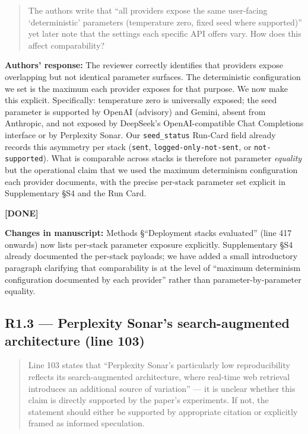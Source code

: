 \documentclass[11pt,a4paper]{article}
\newenvironment{revquote}{%
  \begin{quote}\small\itshape\color{revgray}
}{%
  \end{quote}
}
\newcommand{\response}[1]{\par\noindent\textbf{\color{revgreen}Authors' response:} #1\par}
\newcommand{\changes}[1]{\par\noindent\textbf{\color{revblue}Changes in manuscript:} #1\par}
\newcommand{\done}{\color{revgreen}\textbf{[DONE]}}
\begin{document}
\begin{revquote}
The authors write that ``all providers expose the same user-facing `deterministic' parameters (temperature zero, fixed seed where supported)'' yet later note that the settings each specific API offers vary. How does this affect comparability?
\end{revquote}

\response{The reviewer correctly identifies that providers expose overlapping but not identical parameter surfaces. The deterministic configuration we set is the maximum each provider exposes for that purpose. We now make this explicit. Specifically: temperature zero is universally exposed; the seed parameter is supported by OpenAI (advisory) and Gemini, absent from Anthropic, and not exposed by DeepSeek's OpenAI-compatible Chat Completions interface or by Perplexity Sonar. Our \texttt{seed\_status} Run-Card field already records this asymmetry per stack (\texttt{sent}, \texttt{logged-only-not-sent}, or \texttt{not-supported}). What is comparable across stacks is therefore not parameter \emph{equality} but the operational claim that we used the maximum determinism configuration each provider documents, with the precise per-stack parameter set explicit in Supplementary §S4 and the Run Card.} \done

\changes{Methods §``Deployment stacks evaluated'' (line 417 onwards) now lists per-stack parameter exposure explicitly. Supplementary §S4 already documented the per-stack payloads; we have added a small introductory paragraph clarifying that comparability is at the level of ``maximum determinism configuration documented by each provider'' rather than parameter-by-parameter equality.}

\subsection*{R1.3 --- Perplexity Sonar's search-augmented architecture (line 103)}

\begin{revquote}
Line 103 states that ``Perplexity Sonar's particularly low reproducibility reflects its search-augmented architecture, where real-time web retrieval introduces an additional source of variation'' --- it is unclear whether this claim is directly supported by the paper's experiments. If not, the statement should either be supported by appropriate citation or explicitly framed as informed speculation.
\end{revquote}
\end{document}
